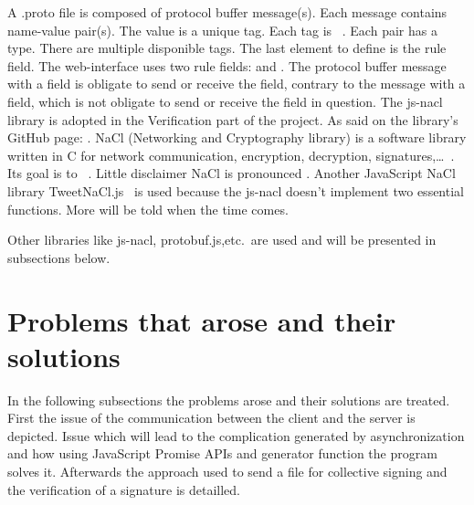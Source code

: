 \documentclass[11pt, a4paper, twoside, openright, openany]{article}
\begin{document}
A .proto file is composed of protocol buffer message(s). Each message contains name-value pair(s).
The value is a unique tag. Each tag is ~\cite{protobufDefi}.
Each pair has a type. There are multiple disponible tags.
\newline
The last element to define is the rule field. The web-interface
uses two rule fields:  and . The protocol buffer message
with a  field is obligate to send or receive the field, contrary to
the message with a  field, which is not obligate to send or receive the field in question.
\newline \newline
The js-nacl~\cite{jsnacl} library is adopted in the Verification part of the project.
As said on the library's GitHub page: .
NaCl (Networking and Cryptography library) is a software library written in C for
network communication, encryption, decryption, signatures,\ldots~\cite{nacl}. Its
goal is to ~\cite{nacl}.
Little disclaimer NaCl is pronounced .
\newline \newline
Another JavaScript NaCl library TweetNaCl.js~\cite{tweetNacl} is used because
the js-nacl doesn't implement two essential functions.
More will be told when the time comes.
\bigbreak

Other libraries like js-nacl, protobuf.js,etc.\ are used and will be presented
in subsections below.
\bigbreak

\section{Problems that arose and their solutions}
In the following subsections the problems arose and their solutions are treated.
\newline
First the issue of the communication between the client and the server is depicted.
Issue which will lead to the complication generated by asynchronization and how using JavaScript Promise APIs
and generator function the program solves it.
\newline
Afterwards the approach used to send a file for collective signing and the verification of a signature
is detailled.
\bigbreak
\end{document}

